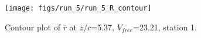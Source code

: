 \begin{figure}[H]
\centering
\texttt{[image: figs/run\_5/run\_5\_R\_contour]}
\caption{Contour plot of $\overline{r}$ at $z/c$=5.37, $V_{free}$=23.21, station 1.}
\label{fig:run_5_R_contour}
\end{figure}


